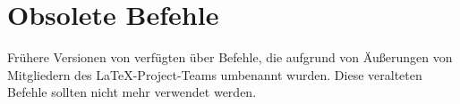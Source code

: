 \section{Obsolete Befehle}

Frühere Versionen von  verfügten über Befehle,
die aufgrund von Äußerungen von Mitgliedern des \LaTeX-Project-Teams umbenannt
wurden. Diese veralteten Befehle sollten nicht mehr verwendet werden.

%
% 
\EndIndexGroup

\endinput


